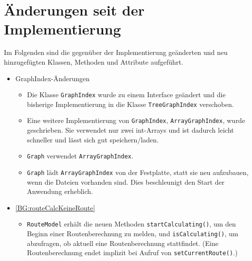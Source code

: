 \documentclass[a4paper, 11pt]{article}
\newcommand{\code}[1]{\texttt{#1}}
\begin{document}
\section{Änderungen seit der Implementierung}
Im Folgenden sind die gegenüber der Implementierung geänderten und neu hinzugefügten Klassen, Methoden und Attribute aufgeführt.

\begin{itemize}
\item GraphIndex-Änderungen
  \begin{itemize}
  \item Die Klasse \code{GraphIndex} wurde zu einem Interface geändert und die bisherige Implementierung in die Klasse \code{TreeGraphIndex} verschoben.
  \item Eine weitere Implementierung von \code{GraphIndex}, \code{ArrayGraphIndex}, wurde geschrieben.
    Sie verwendet nur zwei int-Arrays und ist dadurch leicht schneller und lässt sich gut speichern/laden.
  \item \code{Graph} verwendet \code{ArrayGraphIndex}.
  \item \code{Graph} lädt \code{ArrayGraphIndex} von der Festplatte, statt sie neu aufzubauen, wenn die Dateien vorhanden sind. Dies beschleunigt den Start der Anwendung erheblich.
  \end{itemize}
\item\label{change:routeCalcKeineRoute} \ref{BG:routeCalcKeineRoute}
  \begin{itemize}
  \item \code{RouteModel} erhält die neuen Methoden \code{startCalculating()}, um den Beginn einer Routenberechnung zu melden, und \code{isCalculating()}, um abzufragen, ob aktuell eine Routenberechnung stattfindet.
    (Eine Routenberechnung endet implizit bei Aufruf von \code{setCurrentRoute()}.)
  \end{itemize}
\end{itemize}

\makeatletter
{}
\makeatother
\printglossary[type=main, title={Glossar}, toctitle={Glossar}, style=myAltlist]
\end{document}
